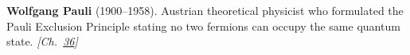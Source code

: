 \nobelphysics \textbf{Wolfgang Pauli} (1900–1958). Austrian theoretical physicist who formulated the Pauli Exclusion Principle stating no two fermions can occupy the same quantum state. \emph{[Ch.~\hyperref[ch:qftvsgr]{36}]}

